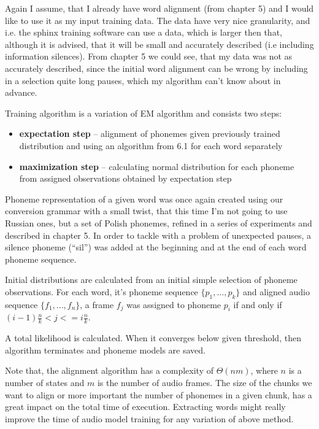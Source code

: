 \documentclass[12pt,a4paper,english]{article}
\begin{document}
Again I assume, that I already have word alignment (from chapter 5) and I would like to use it as my input training data. The data have very nice granularity,
and i.e. the sphinx training software can use a data, which is larger then that, although it is advised, that it will be small and accurately described (i.e including information silences). \newline
From chapter 5 we could see, that my data was not as accurately described, since the initial word alignment can be wrong by including in a selection quite long pauses, which my algorithm can't know about in advance. \newline

Training algorithm is a variation of EM algorithm and consists two steps:
\begin{itemize}
    \item \textbf{expectation step} – alignment of phonemes given previously trained distribution and using an algorithm from 6.1 for each word separately
    \item \textbf{maximization step} – calculating normal distribution for each phoneme from assigned observations obtained by expectation step
\end{itemize}

Phoneme representation of a given word was once again created using our conversion grammar with a small twist, that this time I'm not going to use Russian ones, but a set of Polish phonemes, refined in a series of experiments and described in chapter 5. \newline
In order to tackle with a problem of unexpected pauses, a silence phoneme (“sil”) was added at the beginning and at the end of each word phoneme sequence. \newline

Initial distributions are calculated from an initial simple selection of phoneme observations. For each word, it's phoneme sequence $\{p_1, ..., p_k\}$ and aligned audio sequence $\{f_1, ..., f_n\}$, a frame $f_j$ was assigned to phoneme $p_i$ if and only if $ (i - 1) \frac n k < j <= i \frac n k$.\newline

A total likelihood is calculated. When it converges below given threshold, then algorithm terminates and phoneme models are saved. \newline

Note that, the alignment algorithm has a complexity of $\Theta(nm)$, where $n$ is a number of states and $m$ is the number of audio frames. The size of the chunks we want to align or more important the number of phonemes in a given chunk, has a great impact on the total time of execution. Extracting words might really improve the time of audio model training for any variation of above method.
\end{document}
